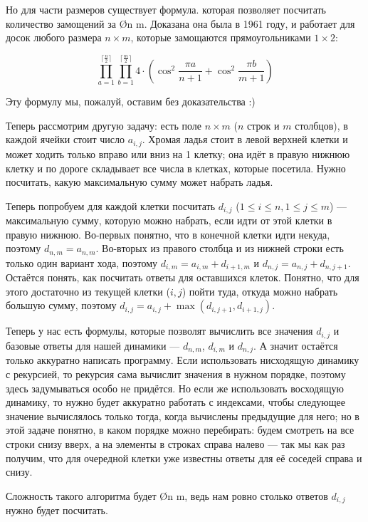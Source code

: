 Но для части размеров существует формула. которая позволяет посчитать количество замощений за \O{n \cdot m}. Доказана она была в 1961 году, и работает для досок любого размера $n \times m$, которые замощаются прямоугольниками $1 \times 2$:

$$\prod\limits_{a=1}^{\lceil {\frac{n}{2}} \rceil} \prod\limits_{b=1}^{\lceil {\frac{m}{2}} \rceil} 4 \cdot \left(\cos^2\frac{\pi a}{n + 1} + \cos^2\frac{\pi b}{m + 1} \right)$$

Эту формулу мы, пожалуй, оставим без доказательства :)


Теперь рассмотрим другую задачу: есть поле $n \times m$ ($n$ строк и $m$ столбцов), в каждой ячейки стоит число $a_{i, j}$. Хромая ладья стоит в левой верхней клетки и может ходить только вправо или вниз на 1 клетку; она идёт в правую нижнюю клетку и по дороге складывает все числа в клетках, которые посетила. Нужно посчитать, какую максимальную сумму может набрать ладья.

Теперь попробуем для каждой клетки посчитать $d_{i, j}$ ($1 \leq i \leq n, 1 \leq j \leq m$)  — максимальную сумму, которую можно набрать, если идти от этой клетки в правую нижнюю. Во-первых понятно, что в конечной клетки идти некуда, поэтому $d_{n, m} = a_{n, m}$. Во-вторых из правого столбца и из нижней строки есть только один вариант хода, поэтому $d_{i, m} = a_{i, m} + d_{i + 1, m}$ и $d_{n, j} = a_{n, j} + d_{n, j + 1}$. Остаётся понять, как посчитать ответы для оставшихся клеток. Понятно, что для этого достаточно из текущей клетки ($i, j$) пойти туда, откуда можно набрать большую сумму, поэтому $d_{i, j} = a_{i, j} + \max(d_{i, j + 1}, d_{i + 1, j})$.

Теперь у нас есть формулы, которые позволят вычислить все значения $d_{i, j}$ и базовые ответы для нашей динамики — $d_{n, m}$, $d_{i, m}$ и $d_{n, j}$. А значит остаётся только аккуратно написать программу. Если использовать нисходящую динамику с рекурсией, то рекурсия сама вычислит значения в нужном порядке, поэтому здесь задумываться особо не придётся. Но если же использовать восходящую динамику, то нужно будет аккуратно работать с индексами, чтобы следующее значение вычислялось только тогда, когда вычислены предыдущие для него; но в этой задаче понятно, в каком порядке можно перебирать: будем смотреть на все строки снизу вверх, а на элементы в строках справа налево — так мы как раз получим, что для очередной клетки уже известны ответы для её соседей справа и снизу.

Сложность такого алгоритма будет \O{n \cdot m}, ведь нам ровно столько ответов $d_{i, j}$ нужно будет посчитать.


